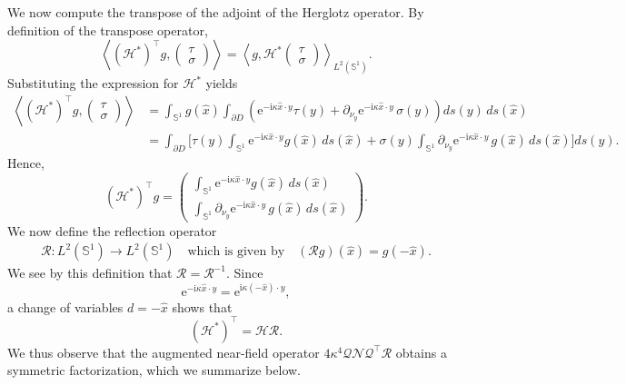 \documentclass{article}
\begin{document}
We now compute the transpose of the adjoint of the Herglotz operator. By definition of the transpose operator,
\[
\left\langle
(\mathcal H^*)^\top g,
\begin{pmatrix}
\tau\\
\sigma
\end{pmatrix}
\right\rangle
=
\left\langle
g,
\mathcal H^*
\begin{pmatrix}
\tau\\
\sigma
\end{pmatrix}
\right\rangle_{L^2(\mathbb S^1)} .
\]
Substituting the expression for $\mathcal H^*$ yields
\begin{align*}
\left\langle
(\mathcal H^*)^\top g,
\begin{pmatrix}
\tau\\
\sigma
\end{pmatrix}
\right\rangle
&=\int_{\mathbb S^1}
g(\hat x)
\int_{\partial D}
\left(
\mathrm e^{-\mathrm i\kappa \hat x\cdot y}\tau(y)
+
\partial_{\nu_y}
\mathrm e^{-\mathrm i\kappa \hat x\cdot y}\,
\sigma(y)
\right)
ds(y)\,ds(\hat x)
\\
&=\int_{\partial D}
\Bigg[
\tau(y)
\int_{\mathbb S^1}
\mathrm e^{-\mathrm i\kappa \hat x\cdot y}
g(\hat x)\,ds(\hat x)
+
\sigma(y)
\int_{\mathbb S^1}
\partial_{\nu_y}
\mathrm e^{-\mathrm i\kappa \hat x\cdot y}
\,g(\hat x)\,ds(\hat x)
\Bigg]
ds(y).
\end{align*}
Hence,
\[
(\mathcal H^*)^\top g
=\begin{pmatrix}
\displaystyle
\int_{\mathbb S^1}
\mathrm e^{-\mathrm i\kappa \hat x\cdot y}
g(\hat x)\,ds(\hat x)
\\[2ex]
\displaystyle
\int_{\mathbb S^1}
\partial_{\nu_y}
\mathrm e^{-\mathrm i\kappa \hat x\cdot y}
\,g(\hat x)\,ds(\hat x)
\end{pmatrix}.
\]
We now define the reflection operator
\begin{align}\label{reflection_op}
\mathcal R : L^2(\mathbb S^1)\to L^2(\mathbb S^1)
\quad\text{which is given by}\quad 
(\mathcal R g)(\hat x)=g(-\hat x).
\end{align}
We see by this definition that $\mathcal R=\mathcal R^{-1}$.
Since
\[
\mathrm e^{-\mathrm i\kappa \hat x\cdot y}
=
\mathrm e^{\mathrm i\kappa (-\hat x)\cdot y},
\]
a change of variables $d=-\hat x$ shows that
\[
(\mathcal H^*)^\top
=
\mathcal H\mathcal R.
\]
We thus observe that the augmented near-field operator $4\kappa^4\mathcal Q\mathcal N\mathcal Q^\top\mathcal R$ obtains a symmetric factorization, which we summarize below.
\end{document}
